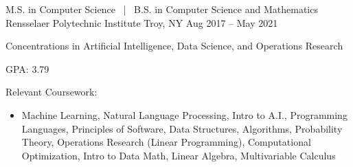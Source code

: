 


\begin{cventries}

  \cventry
  {M.S. in Computer Science \, | \, B.S. in Computer Science and Mathematics}
  {Rensselaer Polytechnic Institute}
  {Troy, NY}
  {Aug 2017 -- May 2021}
  {
    \begin{cvitems}
      \item Concentrations in Artificial Intelligence, Data Science, and Operations Research
      \item GPA: 3.79
      \item Relevant Coursework:
      \begin{itemize}
        \item Machine Learning, Natural Language Processing, Intro to A.I., Programming Languages, Principles of Software, Data Structures, Algorithms, Probability Theory,
              Operations Research (Linear Programming), Computational Optimization, Intro to Data Math, Linear Algebra, Multivariable Calculus
      \end{itemize}
    \end{cvitems}
  }


\end{cventries}